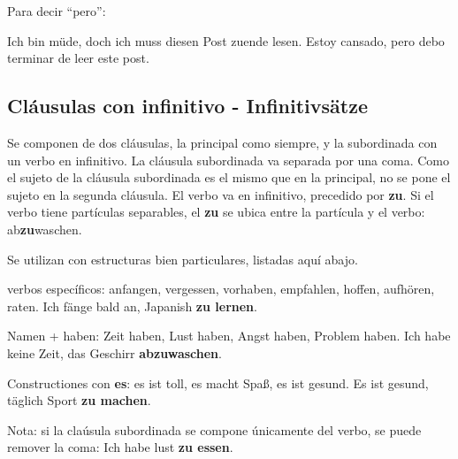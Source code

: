 Para decir ``pero'':
\begin{myitemize}
\item Ich bin müde, doch ich muss diesen Post zuende lesen. Estoy cansado, pero debo terminar de leer este post.
\end{myitemize}

\subsection{Cláusulas con infinitivo - Infinitivsätze}
Se componen de dos cláusulas, la principal como siempre, y la subordinada con un verbo en infinitivo. La cláusula subordinada va separada por una coma. Como el sujeto de la cláusula subordinada es el mismo que en la principal, no se pone el sujeto en la segunda cláusula. El verbo va en infinitivo, precedido por \textbf{zu}. Si el verbo tiene partículas separables, el \textbf{zu} se ubica entre la partícula y el verbo: ab\textbf{zu}waschen.


Se utilizan con estructuras bien particulares, listadas aquí abajo.

\begin{myitemize}
\item verbos específicos: anfangen, vergessen, vorhaben, empfahlen, hoffen, aufhören, raten. Ich fänge bald an, Japanish \textbf{zu lernen}.
\item Namen + haben: Zeit haben, Lust haben, Angst haben, Problem haben. Ich habe keine Zeit, das Geschirr \textbf{abzuwaschen}.
\item Constructiones con \textbf{es}: es ist toll, es macht Spaß, es ist gesund. Es ist gesund, täglich Sport \textbf{zu machen}.
\end{myitemize}

Nota: si la claúsula subordinada se compone únicamente del verbo, se puede remover la coma: Ich habe lust \textbf{zu essen}.